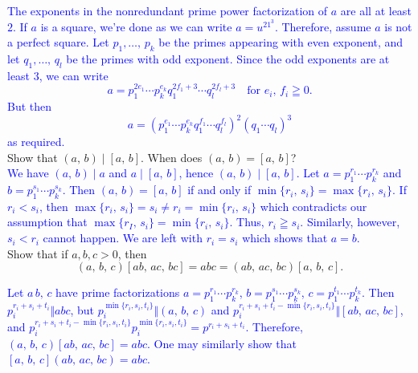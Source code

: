 \documentclass[a4paper,11pt]{article}
\theoremstyle{mythm}
\theoremstyle{mydef}
\newcommand{\blue}[1]{\textcolor{blue}{#1}}
\begin{document}
\blue{The exponents in the nonredundant prime power factorization of $a$ are all
at least $2$. If $a$ is a square, we're done as we can write $a=u^21^3$.
Therefore, assume $a$ is not a perfect square. Let $p_1,\dots,\,p_k$ be the
primes appearing with even exponent, and let $q_1,\dots,\,q_l$ be the primes
with odd exponent. Since the odd exponents are at least 3, we can write
\[
  a=p_1^{2e_1} \cdots p_k^{e_k}q_1^{2f_1+3} \cdots q_l^{2f_l+3} \quad\mbox{for
    $e_i,\,f_i \geqq 0$.}
\]
But then
\[
  a=(p_1^{e_1} \cdots p_k^{e_k}q_1^{f_1} \cdots q_l^{f_l})^2(q_1 \cdots q_l)^3
\]
as required.} \\

 Show that $(a,\,b) \mid [a,\,b]$. When does
$(a,\,b)=[a,\,b]$?  \\

\blue{We have $(a,\,b) \mid a$ and $a \mid [a,\,b]$, hence $(a,\,b) \mid
  [a,\,b]$. Let $a=p_1^{r_1} \cdots p_k^{r_k}$ and $b=p_1^{s_1} \cdots
  p_k^{s_k}$. Then $(a,\,b)=[a,\,b]$ if and only if
  $\min\{r_i,\,s_i\}=\max\{r_i,\,s_i\}$. If $r_i < s_i$, then $\max\{r_i,\,s_i\}
  = s_i \neq r_i = \min\{r_i,\,s_i\}$ which contradicts our assumption that
  $\max\{r_I,\,s_i\}=\min\{r_i,\,s_i\}$. Thus, $r_i \geqq s_i$. Similarly,
  however, $s_i < r_i$ cannot happen. We are left with $r_i=s_i$ which shows
  that $a=b$.} \\

 Show that if $a,b,c > 0$, then
\[
  (a,\,b,\,c)[ab,\,ac,\,bc] = abc = (ab,\,ac,\,bc)[a,\,b,\,c].
\]

\blue{Let $a\,b,\,c$ have prime factorizations $a=p_1^{r_1} \cdots p_k^{r_k}$,
  $b=p_1^{s_1} \cdots p_k^{s_k}$, $c=p_1^{t_1} \cdots p_k^{t_k}$. Then
  $p_i^{r_i+s_i+t_i} \Vert abc$, but $p_i^{\min\{r_i,s_i,t_i\}} \Vert
  (a,\,b,\,c)$ and $p_i^{r_i+s_i+t_i-\min\{r_i,s_i,t_i\}} \Vert [ab,\,ac,\,bc]$,
and
$p_i^{r_i+s_i+t_i-\min\{r_i,s_i,t_i\}}p_i^{\min\{r_i,s_i,t_i\}}=p^{r_i+s_i+t_i}$.
Therefore, $(a,\,b,\,c)[ab,\,ac,\,bc]=abc$. One may similarly show that
$[a,\,b,\,c](ab,\,ac,\,bc)=abc$.} \\
\end{document}
